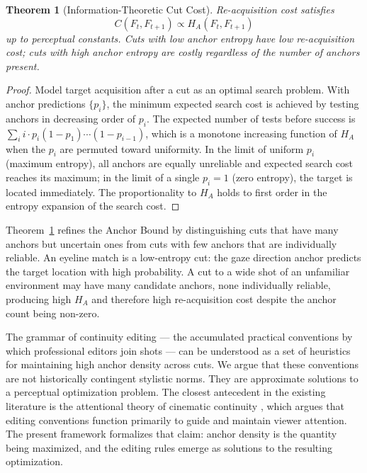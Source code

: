 \documentclass[12pt, a4paper]{article}
\theoremstyle{plain}
\newtheorem{theorem}{Theorem}[section]
\theoremstyle{definition}
\theoremstyle{remark}
\begin{document}
\begin{theorem}[Information-Theoretic Cut Cost]
\label{thm:cut_entropy}
  Re-acquisition cost satisfies
  \begin{equation}
    C(F_t, F_{t+1}) \propto H_A(F_t, F_{t+1})
  \end{equation}
  up to perceptual constants. Cuts with low anchor entropy
  have low re-acquisition cost; cuts with high anchor
  entropy are costly regardless of the number of anchors
  present.
\end{theorem}

\begin{proof}
  Model target acquisition after a cut as an optimal
  search problem. With anchor predictions $\{p_i\}$, the
  minimum expected search cost is achieved by testing
  anchors in decreasing order of $p_i$. The expected number
  of tests before success is $\sum_i i \cdot p_i (1 -
  p_1)\cdots(1-p_{i-1})$, which is a monotone increasing
  function of $H_A$ when the $p_i$ are permuted toward
  uniformity. In the limit of uniform $p_i$ (maximum
  entropy), all anchors are equally unreliable and expected
  search cost reaches its maximum; in the limit of a single
  $p_i = 1$ (zero entropy), the target is located
  immediately. The proportionality to $H_A$ holds to first
  order in the entropy expansion of the search cost.
\end{proof}

Theorem~\ref{thm:cut_entropy} refines the Anchor Bound by
distinguishing cuts that have many anchors but uncertain
ones from cuts with few anchors that are individually
reliable. An eyeline match is a low-entropy cut: the gaze
direction anchor predicts the target location with high
probability. A cut to a wide shot of an unfamiliar
environment may have many candidate anchors, none
individually reliable, producing high $H_A$ and therefore
high re-acquisition cost despite the anchor count being
non-zero.
\label{subsec:grammar}

The grammar of continuity editing --- the accumulated
practical conventions by which professional editors join
shots --- can be understood as a set of heuristics for
maintaining high anchor density across cuts. We argue that
these conventions are not historically contingent stylistic
norms. They are approximate solutions to a perceptual
optimization problem. The closest antecedent in the
existing literature is the attentional theory of cinematic
continuity \cite{smith2012}, which argues that editing
conventions function primarily to guide and maintain viewer
attention. The present framework formalizes that claim:
anchor density is the quantity being maximized, and the
editing rules emerge as solutions to the resulting
optimization.
\end{document}

